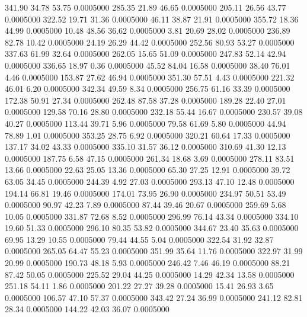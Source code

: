  341.90   34.78   53.75   0.0005000
 285.35   21.89   46.65   0.0005000
 205.11   26.56   43.77   0.0005000
 322.52   19.71   31.36   0.0005000
  46.11   38.87   21.91   0.0005000
 355.72   18.36   44.99   0.0005000
  10.48   48.56   36.62   0.0005000
   3.81   20.69   28.02   0.0005000
 236.89   82.78   10.42   0.0005000
  24.19   26.29   44.42   0.0005000
 252.56   80.93   53.27   0.0005000
 337.63   61.99   32.64   0.0005000
 262.05   15.65   51.09   0.0005000
 247.83   52.14   42.94   0.0005000
 336.65   18.97    0.36   0.0005000
  45.52   84.04   16.58   0.0005000
  38.40   76.01    4.46   0.0005000
 153.87   27.62   46.94   0.0005000
 351.30   57.51    4.43   0.0005000
 221.32   46.01    6.20   0.0005000
 342.34   49.59    8.34   0.0005000
 256.75   61.16   33.39   0.0005000
 172.38   50.91   27.34   0.0005000
 262.48   87.58   37.28   0.0005000
 189.28   22.40   27.01   0.0005000
 129.58   70.16   28.80   0.0005000
 232.18   55.44   16.67   0.0005000
 230.57   39.08   40.27   0.0005000
 113.44   39.71    5.96   0.0005000
  79.58   61.69    5.80   0.0005000
  44.94   78.89    1.01   0.0005000
 353.25   28.75    6.92   0.0005000
 320.21   60.64   17.33   0.0005000
 137.17   34.02   43.33   0.0005000
 335.10   31.57   36.12   0.0005000
 310.69   41.30   12.13   0.0005000
 187.75    6.58   47.15   0.0005000
 261.34   18.68    3.69   0.0005000
 278.11   83.51   13.66   0.0005000
  22.63   25.05   13.36   0.0005000
  65.30   27.25   12.91   0.0005000
  39.72   63.05   34.45   0.0005000
 244.39    4.92   27.03   0.0005000
 293.13   47.10   12.48   0.0005000
 194.14   66.81   19.46   0.0005000
 174.01   73.95   26.90   0.0005000
 234.97   50.51   53.49   0.0005000
  90.97   42.23    7.89   0.0005000
  87.44   39.46   20.67   0.0005000
 259.69    5.68   10.05   0.0005000
 331.87   72.68    8.52   0.0005000
 296.99   76.14   43.34   0.0005000
 334.10   19.60   51.33   0.0005000
 296.10   80.35   53.82   0.0005000
 344.67   23.40   35.63   0.0005000
  69.95   13.29   10.55   0.0005000
  79.44   44.55    5.04   0.0005000
 322.54   31.92   32.87   0.0005000
 265.05   64.47   55.23   0.0005000
 351.99   35.64   11.76   0.0005000
 322.97   31.99   20.99   0.0005000
 190.73   48.18    5.93   0.0005000
 246.42    7.46   46.19   0.0005000
  88.21   87.42   50.05   0.0005000
 225.52   29.04   44.25   0.0005000
  14.29   42.34   13.58   0.0005000
 251.18   54.11    1.86   0.0005000
 201.22   27.27   39.28   0.0005000
  15.41   26.93    3.65   0.0005000
 106.57   47.10   57.37   0.0005000
 343.42   27.24   36.99   0.0005000
 241.12   82.81   28.34   0.0005000
 144.22   42.03   36.07   0.0005000
